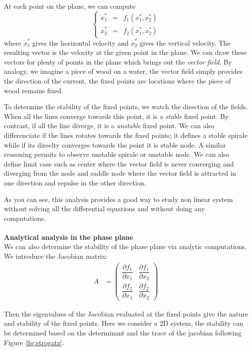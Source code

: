 At each point on the plane, we can compute
\begin{equation*}
\left\{
    \begin{array}{lllllll}
        \dot{x}_1^* &=& f_1(x_1^*,x_2^*)\\
        \dot{x}_2^* &=& f_2(x_1^*,x_2^*) 
    \end{array}
\right.
\end{equation*}
where $\dot{x}_1^*$ gives the horizontal velocity and  $\dot{x}_2^*$ gives the vertical velocity. The resulting vector is the velocity at the given point in the plane. We can draw these vectors for plenty of points in the plane which brings out the \textit{vector field}. By analogy, we imagine a piece of wood on a water, the vector field simply provides the direction of the current, the fixed points are locations where the piece of wood remains fixed. 

To determine the stability of the fixed points, we watch the direction of the fields. When all the lines converge towards this point, it is a \textit{stable} fixed point. By contrast, if all the line diverge, it is a \textit{unstable} fixed point. We can also differenciate if the lines rotates towards the fixed points; it defines a stable spirale while if its direclty converges towards the point it is stable node. A similar reasoning permits to observe unstable spirale or unstable node. We can also define limit case such as center where the vector field is never converging and diverging from the node and saddle node where the vector field is attracted in one direction and repulse in the other direction. 

As you can see, this analysis provides a good way to study non linear system without solving all the differential equations and without doing any computations. \\
~\\
\textbf{Analytical analysis in the phase plane}\\
We can also determine the stability of the phase plane via analytic computations. We introduce the Jacobian matrix: 
\begin{align*}
    A &=  \begin{pmatrix}  \dfrac{\partial f_1}{\partial x_1} & \dfrac{\partial f_1}{\partial x_2} \\  \dfrac{\partial f_2}{\partial x_1} & \dfrac{\partial f_2}{\partial x_2}  \end{pmatrix}
\end{align*}

Then the eigenvalues of the Jacobian evaluated at the fixed points give the nature and stability of the fixed points. Here we consider a 2D system, the stability can be determined based on the determinant and the trace of the jacobian following Figure \ref{fig:strogatz}.


